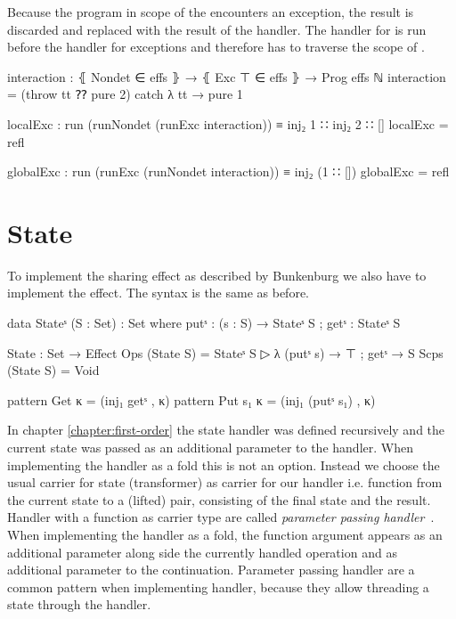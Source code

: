 Because the program in scope of the  encounters an
exception, the result is discarded and replaced with the result of the handler.
The handler for  is run before the handler for exceptions
and therefore has to traverse the scope of .

\begin{code}
interaction : ⦃ Nondet ∈ effs ⦄ → ⦃ Exc ⊤ ∈ effs ⦄ → Prog effs ℕ
interaction = (throw tt ⁇ pure 2) catch λ tt → pure 1

localExc : run (runNondet (runExc interaction)) ≡ inj₂ 1 ∷ inj₂ 2 ∷ []
localExc = refl

globalExc : run (runExc (runNondet interaction)) ≡ inj₂ (1 ∷ [])
globalExc = refl
\end{code}

\section{State}
\label{scoped-algebra:state}

To implement the sharing effect as described by Bunkenburg we also have to
implement the  effect.
The syntax is the same as before.

\begin{code}
data Stateˢ (S : Set) : Set where putˢ : (s : S) → Stateˢ S ; getˢ : Stateˢ S

State : Set → Effect
Ops   (State S) = Stateˢ S ▷ λ{ (putˢ s) → ⊤ ; getˢ → S }
Scps  (State S) = Void

pattern Get κ     = (inj₁ getˢ , κ)
pattern Put s₁ κ  = (inj₁ (putˢ s₁) , κ)
\end{code}
In chapter \ref{chapter:first-order} the state handler was defined recursively
and the current state was passed as an additional parameter to the handler.
When implementing the handler as a fold this is not an option.
Instead we choose the usual carrier for state (transformer) as carrier for our handler i.e.
function from the current state to a (lifted) pair, consisting of the final
state and the result.
Handler with a function as carrier type are called \textit{parameter passing
  handler}~\cite{DBLP:conf/esop/PlotkinP09}.
When implementing the handler as a fold, the function argument appears as an
additional parameter along side the currently handled operation and as
additional parameter to the continuation.
Parameter passing handler are a common pattern when implementing handler,
because they allow threading a state through the handler.

